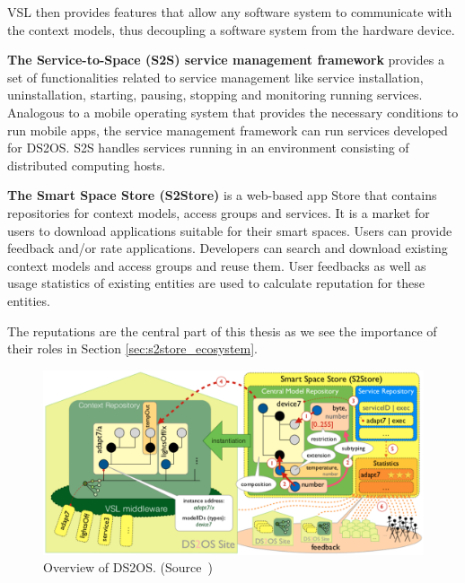 VSL then provides features that allow any software system to communicate with the context models, thus decoupling a software system from the hardware device.

\textbf{The Service-to-Space (S2S) service management framework} provides a set of functionalities related to service management like service installation, uninstallation, starting, pausing, stopping and monitoring running services. Analogous to a mobile operating system that provides the necessary conditions to run mobile apps, the service management framework can run services developed for DS2OS. S2S handles services running in an environment consisting of distributed computing hosts.

\textbf{The Smart Space Store (S2Store)} is a web-based app Store that contains repositories for context models, access groups and services. It is a market for users to download applications suitable for their smart spaces. Users can provide feedback and/or rate applications. Developers can search and download existing context models and access groups and reuse them. User feedbacks as well as usage statistics of existing entities are used to calculate reputation for these entities.

The reputations are the central part of this thesis as we see the importance of their roles in Section \ref{sec:s2store_ecosystem}.

\begin{landscape}

  \begin{figure}
    \centering
    \includegraphics[width=21cm]{figures/ds2os.png} 
    \caption{Overview of DS2OS. (Source~\cite{pahl2014distributed})}
    \label{fig:ds2os}
  \end{figure}

\end{landscape}
